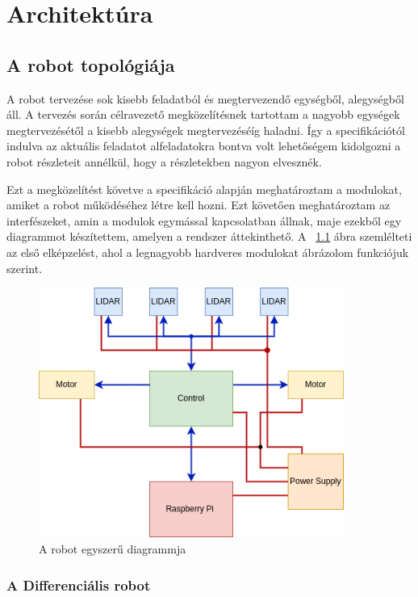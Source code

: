 \chapter{Architektúra}

\section{A robot topológiája}

A robot tervezése sok kisebb feladatból és megtervezendő egységből, alegységből
áll. A tervezés során célravezető megközelítésnek tartottam a nagyobb egységek
megtervezésétől a kisebb alegységek megtervezéséíg haladni. Így a specifikációtól
indulva az aktuális feladatot alfeladatokra bontva volt lehetőségem kidolgozni a
robot részleteit annélkül, hogy a részletekben nagyon elvesznék.

Ezt a megközelítést követve a specifikáció alapján meghatároztam a modulokat,
amiket a robot működéséhez létre kell hozni. Ezt követően meghatároztam az
interfészeket, amin a modulok egymással kapcsolatban állnak, maje ezekből egy
diagrammot készítettem, amelyen a rendszer áttekinthető. A
~\ref{fig:robot-diagram-simple} ábra szemlélteti az első elképzelést, ahol a
legnagyobb hardveres modulokat ábrázolom funkciójuk szerint.

\begin{figure}
  \centering
  \includegraphics[width=100mm, keepaspectratio]{figures/ch2/robot-diagram-simple.png}
  \caption{A robot egyszerű diagrammja}
  \label{fig:robot-diagram-simple}
\end{figure}

\subsection{A Differenciális robot}

